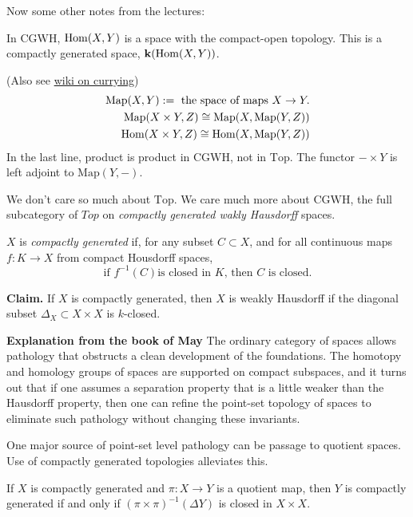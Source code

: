 Now some other notes from the lectures:
	
In $\text{CGWH}$, $\mathop{\mathrm{Hom}}\nolimits(X,Y)$ is a space with the compact-open topology.
This is a compactly generated space, $\mathbf{k}(\mathop{\mathrm{Hom}}\nolimits(X,Y))$.

(Also see \href{https://en.wikipedia.org/wiki/Currying#Function_spaces}{wiki on currying})
\begin{align*}
\text{Map}(X,Y):=\text{ the space of maps }X\to Y.\\
\text{Map}(X\times Y,Z)\cong\text{Map}(X,\text{Map}(Y,Z))\\
\mathop{\mathrm{Hom}}\nolimits(X\times Y,Z)\cong \mathop{\mathrm{Hom}}\nolimits(X,\text{Map}(Y,Z))
\end{align*}
In the last line, product is product in $\text{CGWH}$, not in $\text{Top}$.
The functor $-\times Y$ is left adjoint to $\text{Map}(Y,-)$.

We don't care so much about $\text{Top}$. We care much more about $\text{CGWH}$,
the full subcategory of $\mathit{Top}$ on
 {\it compactly generated wakly Hausdorff} spaces.

\begin{definition}
$X$ is {\it compactly generated} if, for any subset $C\subset X$, and for all continuous maps $f:K\to X$ from compact Housdorff spaces, $$\text{if } f^{-1}(C) \text{is closed in }K\text{, then } C\text{ is closed}.$$
\end{definition}
{\bf Claim.}
If $X$ is compactly generated, then $X$ is weakly Hausdorff if the diagonal subset $\Delta_X\subset X\times X$ is {\color{orange}$k$-closed}.
 

{\bf Explanation from the book of May} 
The ordinary category of spaces
allows pathology that obstructs a clean 
development of the foundations. 
The homotopy and homology groups of spaces 
are supported on compact subspaces, and
it turns out that if one assumes a separation property 
that is a little weaker
than the Hausdorff property, 
then one can refine the point-set topology of
spaces to eliminate 
such pathology without changing these invariants.
	
One major source of point-set level pathology 
can be passage to quotient spaces. 
Use of compactly generated topologies alleviates this.

\begin{proposition}
If $X$ is compactly generated and $\pi:X\to Y$ is a quotient map, 
then $Y$ is compactly generated if and only if $(\pi\times \pi)^{-1}(\Delta Y)$
 is closed in $X\times X$.
\end{proposition}

